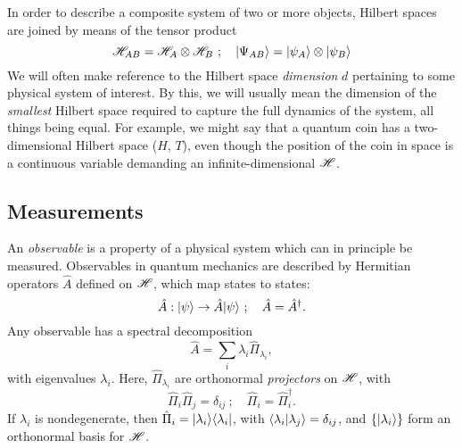 In order to describe a composite system of two or more objects, Hilbert spaces are joined by means of the tensor product
\begin{equation}
    \mathscr{H}_{AB}  = \mathscr{H}_A \otimes \mathscr{H}_B ~; \quad \mbox{$ | \Psi_{AB} \rangle $} = \mbox{$ | \psi_A \rangle $} \otimes \mbox{$ | \psi_B \rangle $}
\end{equation}
We will often make reference to the Hilbert space \emph{dimension} $d$ pertaining to some physical system of interest. By this, we will usually mean the dimension of the \emph{smallest} Hilbert space required to capture the full dynamics of the system, all things being equal. For example, we might say that a quantum coin has a two-dimensional Hilbert space ($H$, $T$), even though the position of the coin in space is a continuous variable demanding an infinite-dimensional $\mathscr{H}$.

\subsection{Measurements}
\label{sec:quantum-measurement}
\newcommand{\obs}{\hat{A}}
\newcommand{\projector}{\hat{\Pi}}
An \emph{observable} is a property of a physical system which can in principle be measured.
Observables in quantum mechanics are described by Hermitian operators $\obs$ defined on $\mathscr{H}$, which map states to states:
\begin{equation}
   \obs : \thestate \rightarrow \obs \thestate ~; \quad \obs = \obs^\dagger.
\end{equation}
Any observable has a spectral decomposition
\begin{equation}
   \obs = \sum_i \lambda_i \projector_{\lambda_i},
\end{equation}
with eigenvalues $\lambda_i$. 
Here, $\projector_{\lambda_i}$ are orthonormal \emph{projectors} on $\mathscr{H}$, with 
\begin{equation}
\projector_i \projector_j = \delta_{ij} ~ ; \quad \projector_i= \projector_i^\dagger.
\end{equation}
If $\lambda_i$ is nondegenerate, then 
$\projector_i = \ket{\lambda_i}\bra{\lambda_i}$, with $\langle \lambda_i | \lambda_j \rangle = \delta_{ij}$, and $\{\mbox{$ | \lambda_i \rangle $}\}$ form an orthonormal basis for $\mathscr{H}$.

